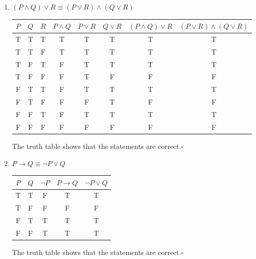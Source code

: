 \documentclass[11pt]{article}
\begin{document}
\begin{enumerate}
	      \newpage
	\item $(P \land Q) \lor R \equiv (P \lor R) \land (Q \lor R)$
	      \begin{center}
		      \begin{tabular}{|c|c|c|c|c|c|c|c|}
			      \hline
			      $P$ & $Q$ & $R$ & $P \land Q$ & $P \lor R$ & $Q \lor R$ & $(P \land Q) \lor R$ & $(P \lor R) \land (Q \lor R)$ \\
			      \hline
			      T   & T   & T   & T           & T          & T          & T                    & T                             \\
			      T   & T   & F   & T           & T          & T          & T                    & T                             \\
			      T   & F   & T   & F           & T          & T          & T                    & T                             \\
			      T   & F   & F   & F           & T          & F          & F                    & F                             \\
			      F   & T   & T   & F           & T          & T          & T                    & T                             \\
			      F   & T   & F   & F           & F          & T          & F                    & F                             \\
			      F   & F   & T   & F           & T          & T          & T                    & T                             \\
			      F   & F   & F   & F           & F          & F          & F                    & F                             \\
			      \hline
		      \end{tabular}
	      \end{center}
	      The truth table shows that the statements are correct.\qquad $\square$

	\item $P  \rightarrow Q \equiv \neg P \lor Q$
	      \begin{center}
		      \begin{tabular}{|c|c|c|c|c|}
			      \hline
			      $P$ & $Q$ & $\neg P$ & $P \rightarrow Q$ & $\neg P \lor Q$ \\
			      \hline
			      T   & T   & F        & T                 & T               \\
			      T   & F   & F        & F                 & F               \\
			      F   & T   & T        & T                 & T               \\
			      F   & F   & T        & T                 & T               \\
			      \hline
		      \end{tabular}
	      \end{center}
	      The truth table shows that the statements are correct.\qquad $\square$


\end{enumerate}
\end{document}
